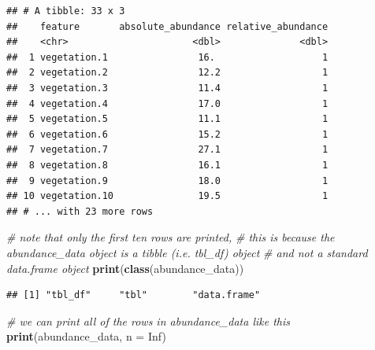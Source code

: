 \documentclass[12pt,]{book}
\newenvironment{Shaded}{\begin{snugshade}}{\end{snugshade}}
\newcommand{\KeywordTok}[1]{\textcolor[rgb]{0.13,0.29,0.53}{\textbf{#1}}}
\newcommand{\DataTypeTok}[1]{\textcolor[rgb]{0.13,0.29,0.53}{#1}}
\newcommand{\CommentTok}[1]{\textcolor[rgb]{0.56,0.35,0.01}{\textit{#1}}}
\newcommand{\OtherTok}[1]{\textcolor[rgb]{0.56,0.35,0.01}{#1}}
\newcommand{\NormalTok}[1]{#1}
\begin{document}
\begin{verbatim}
## # A tibble: 33 x 3
##    feature       absolute_abundance relative_abundance
##    <chr>                      <dbl>              <dbl>
##  1 vegetation.1                16.                   1
##  2 vegetation.2                12.2                  1
##  3 vegetation.3                11.4                  1
##  4 vegetation.4                17.0                  1
##  5 vegetation.5                11.1                  1
##  6 vegetation.6                15.2                  1
##  7 vegetation.7                27.1                  1
##  8 vegetation.8                16.1                  1
##  9 vegetation.9                18.0                  1
## 10 vegetation.10               19.5                  1
## # ... with 23 more rows
\end{verbatim}

\clearpage

\begin{Shaded}
\begin{Highlighting}[]
\CommentTok{# note that only the first ten rows are printed,}
\CommentTok{# this is because the abundance_data object is a tibble (i.e. tbl_df) object}
\CommentTok{# and not a standard data.frame object}
\KeywordTok{print}\NormalTok{(}\KeywordTok{class}\NormalTok{(abundance_data))}
\end{Highlighting}
\end{Shaded}

\begin{verbatim}
## [1] "tbl_df"     "tbl"        "data.frame"
\end{verbatim}

\begin{Shaded}
\begin{Highlighting}[]
\CommentTok{# we can print all of the rows in abundance_data like this}
\KeywordTok{print}\NormalTok{(abundance_data, }\DataTypeTok{n =} \OtherTok{Inf}\NormalTok{)}
\end{Highlighting}
\end{Shaded}
\end{document}
